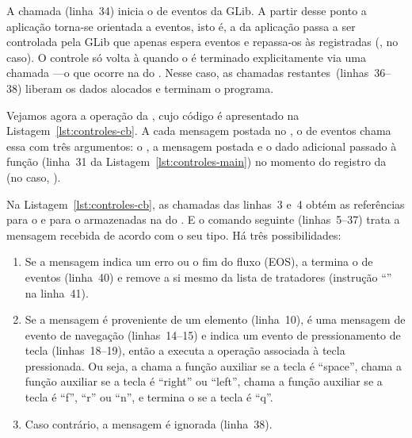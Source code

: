 \documentclass{SBCbookchapter}
\begin{document}
A chamada  (linha~34) inicia o  de eventos da
GLib.  A partir desse ponto a aplicação torna-se orientada a eventos, isto
é, a  da aplicação passa a ser controlada pela GLib que apenas
espera eventos e repassa-os às  registradas (, no
caso).  O controle só volta à  quando o  é terminado
explicitamente via uma chamada ---o que ocorre na
 do .  Nesse caso, as chamadas
restantes~(linhas~36--38) liberam os dados alocados e terminam o programa.



Vejamos agora a operação da  , cujo código é
apresentado na Listagem~\ref{lst:controles-cb}.  A cada mensagem postada no
, o  de eventos chama essa  com três
argumentos: o , a mensagem postada e o dado adicional passado à
função  (linha~31 da Listagem~\ref{lst:controles-main})
no momento do registro da  (no caso, ).

Na Listagem~\ref{lst:controles-cb}, as chamadas das linhas~3 e~4 obtém as
referências para o  e para o  armazenadas na 
do .  E o comando  seguinte (linhas~5--37) trata a
mensagem recebida de acordo com o seu tipo.  Há três possibilidades:
\begin{enumerate}
\item Se a mensagem indica um erro ou o fim do fluxo (EOS), a 
  termina o  de eventos (linha~40) e remove a si mesmo da lista de
  tratadores (instrução ``'' na linha~41).
\item Se a mensagem é proveniente de um elemento (linha~10), é uma mensagem
  de evento de navegação (linhas~14--15) e indica um evento de
  pressionamento de tecla (linhas~18--19), então a  executa a
  operação associada à tecla pressionada.  Ou seja, a  chama a
  função auxiliar  se a tecla é ``space'', chama a função
  auxiliar  se a tecla é ``right'' ou ``left'', chama a função
  auxiliar  se a tecla é ``f'', ``r'' ou ``n'', e termina o
   se a tecla é ``q''.
\item Caso contrário, a mensagem é ignorada (linha~38).
\end{enumerate}
\end{document}
